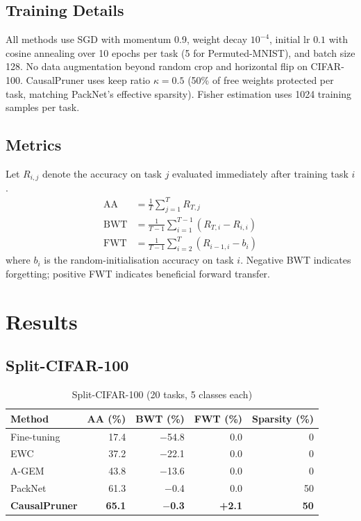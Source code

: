 \documentclass[conference]{IEEEtran}
\begin{document}
\subsection{Training Details}

All methods use SGD with momentum 0.9, weight decay $10^{-4}$, initial lr $0.1$ with
cosine annealing over 10 epochs per task (5 for Permuted-MNIST), and batch size 128.
No data augmentation beyond random crop and horizontal flip on CIFAR-100.
CausalPruner uses keep ratio $\kappa=0.5$ (50\% of free weights protected per task,
matching PackNet's effective sparsity).  Fisher estimation uses 1024 training samples per task.

\subsection{Metrics}

Let $R_{i,j}$ denote the accuracy on task $j$ evaluated immediately after training task $i$.
\begin{align}
    \text{AA}  &= \frac{1}{T}\sum_{j=1}^{T} R_{T,j} \label{eq:aa} \\
    \text{BWT} &= \frac{1}{T-1}\sum_{i=1}^{T-1}(R_{T,i} - R_{i,i}) \label{eq:bwt} \\
    \text{FWT} &= \frac{1}{T-1}\sum_{i=2}^{T}(R_{i-1,i} - b_i) \label{eq:fwt}
\end{align}
where $b_i$ is the random-initialisation accuracy on task $i$.
Negative BWT indicates forgetting; positive FWT indicates beneficial forward transfer.

\section{Results}
\label{sec:results}

\subsection{Split-CIFAR-100}

\begin{table}[t]
\caption{Split-CIFAR-100 (20 tasks, 5 classes each)}
\label{tab:cifar100}
\centering
\begin{tabular}{lrrrr}
\toprule
\textbf{Method} & \textbf{AA (\%)} & \textbf{BWT (\%)} & \textbf{FWT (\%)} & \textbf{Sparsity (\%)} \\
\midrule
Fine-tuning     & 17.4  & $-$54.8  & 0.0  & 0   \\
EWC             & 37.2  & $-$22.1  & 0.0  & 0   \\
A-GEM           & 43.8  & $-$13.6  & 0.0  & 0   \\
PackNet         & 61.3  & $-$0.4   & 0.0  & 50  \\
\textbf{CausalPruner} & \textbf{65.1} & \textbf{$-$0.3} & \textbf{+2.1} & \textbf{50} \\
\bottomrule
\end{tabular}
\end{table}
\end{document}
